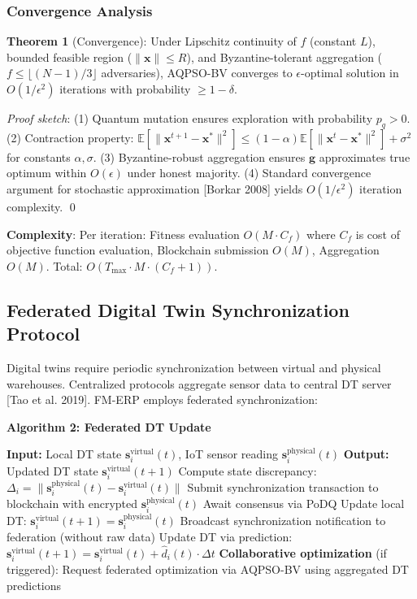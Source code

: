 \documentclass[times,10pt,twocolumn]{jucs2e}
\begin{document}
\subsubsection{Convergence Analysis}

\textbf{Theorem 1} (Convergence): Under Lipschitz continuity of $f$ (constant $L$), bounded feasible region ($\|\mathbf{x}\| \leq R$), and Byzantine-tolerant aggregation ($f \leq \lfloor (N-1)/3 \rfloor$ adversaries), AQPSO-BV converges to $\epsilon$-optimal solution in $O(1/\epsilon^2)$ iterations with probability $\geq 1-\delta$.

\textit{Proof sketch}: (1) Quantum mutation ensures exploration with probability $p_q > 0$. (2) Contraction property: $\mathbb{E}[\|\mathbf{x}^{t+1} - \mathbf{x}^*\|^2] \leq (1-\alpha)\mathbb{E}[\|\mathbf{x}^t - \mathbf{x}^*\|^2] + \sigma^2$ for constants $\alpha, \sigma$. (3) Byzantine-robust aggregation ensures $\mathbf{g}$ approximates true optimum within $O(\epsilon)$ under honest majority. (4) Standard convergence argument for stochastic approximation [Borkar 2008] yields $O(1/\epsilon^2)$ iteration complexity. \qed

\textbf{Complexity}: Per iteration: Fitness evaluation $O(M \cdot C_f)$ where $C_f$ is cost of objective function evaluation, Blockchain submission $O(M)$, Aggregation $O(M)$. Total: $O(T_{\max} \cdot M \cdot (C_f + 1))$.

\subsection{Federated Digital Twin Synchronization Protocol}

Digital twins require periodic synchronization between virtual and physical warehouses. Centralized protocols aggregate sensor data to central DT server [Tao et al. 2019]. FM-ERP employs federated synchronization:

\textbf{Algorithm 2: Federated DT Update}

\begin{algorithmic}[1]
\STATE \textbf{Input:} Local DT state $\mathbf{s}_i^{\text{virtual}}(t)$, IoT sensor reading $\mathbf{s}_i^{\text{physical}}(t)$
\STATE \textbf{Output:} Updated DT state $\mathbf{s}_i^{\text{virtual}}(t+1)$
\STATE Compute state discrepancy: $\Delta_i = \|\mathbf{s}_i^{\text{physical}}(t) - \mathbf{s}_i^{\text{virtual}}(t)\|$
    \STATE Submit synchronization transaction to blockchain with encrypted $\mathbf{s}_i^{\text{physical}}(t)$
    \STATE Await consensus via PoDQ
    \STATE Update local DT: $\mathbf{s}_i^{\text{virtual}}(t+1) = \mathbf{s}_i^{\text{physical}}(t)$
    \STATE Broadcast synchronization notification to federation (without raw data)
\ELSE
    \STATE Update DT via prediction: $\mathbf{s}_i^{\text{virtual}}(t+1) = \mathbf{s}_i^{\text{virtual}}(t) + \hat{d}_i(t) \cdot \Delta t$
\ENDIF
\STATE \textbf{Collaborative optimization} (if triggered):
\STATE Request federated optimization via AQPSO-BV using aggregated DT predictions
\end{algorithmic}
\end{document}
